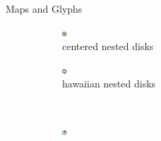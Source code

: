\documentclass{beamer}
\begin{document}
\begin{frame}{Maps and Glyphs}
  \begin{figure}[!b]
    \centering
    \begin{subfigure}[b]{0.45\linewidth}
      \centering
      \includegraphics[width=0.5\linewidth]{assets/symbol_nested_circles}
      \caption{centered nested disks}
    \end{subfigure}
    \begin{subfigure}[b]{0.45\linewidth}
      \centering
      \includegraphics[width=0.5\linewidth]{assets/symbol_nested_elastic_circles}
      \caption{hawaiian nested disks}
    \end{subfigure}\\
    \begin{subfigure}[b]{0.45\linewidth}
      \centering
      \includegraphics[width=0.5\linewidth]{assets/symbol_pie}

\end{subfigure}
\end{figure}
\end{frame}
\end{document}
